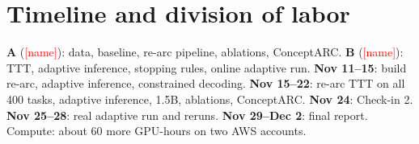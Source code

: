 \documentclass{article}
\begin{document}
\section{Timeline and division of labor}

\textbf{A} (\textcolor{red}{[name]}): data, baseline, re-arc pipeline, ablations, ConceptARC. \textbf{B} (\textcolor{red}{[name]}): TTT, adaptive inference, stopping rules, online adaptive run. \textbf{Nov 11--15}: build re-arc, adaptive inference, constrained decoding. \textbf{Nov 15--22}: re-arc TTT on all 400 tasks, adaptive inference, 1.5B, ablations, ConceptARC. \textbf{Nov 24}: Check-in 2. \textbf{Nov 25--28}: real adaptive run and reruns. \textbf{Nov 29--Dec 2}: final report. Compute: about 60 more GPU-hours on two AWS accounts.

\printbibliography
\end{document}

